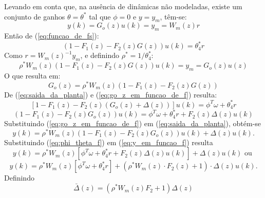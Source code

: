   Levando em conta que, na ausência de dinâmicas não modeladas, existe um conjunto de ganhos $\theta = \theta^*$ tal que $\phi = 0$ e $y = y_m$, têm-se:
  \begin{equation}
    y(k) = G_o(z) u(k) = y_m = W_m(z) r
  \end{equation}
  Então de (\ref{eq:funcao_de_fs}):
  \begin{equation}
    \left( 1 - F_1(z) - F_2(z) G(z) \right) u(k) = \theta_4^* r
  \end{equation}
  Como $r = W_m(z)^{-1} y_m$, e definindo $\rho^* = 1/\theta_4^*$:
  \begin{equation*}
    \rho^* W_m(z) \left( 1 - F_1(z) - F_2(z) G(z) \right) u(k) = y_m = G_o(z) u(z)
  \end{equation*}
  O que resulta em:
  \begin{equation}
    G_o(z) = \rho^* W_m(z) \left( 1 - F_1(z) - F_2(z) G(z) \right)
    \label{eq:go_z_em_funcao_de_f}
  \end{equation}
  De (\ref{eq:saida_da_planta}) e (\ref{eq:go_z_em_funcao_de_f}) resulta:
  \begin{equation*}
    \left[ 1 - F_1(z) - F_2(z) \left( G_o(z) + \Delta(z) \right) \right] u(k) = \phi^T \omega + \theta_4^* r
  \end{equation*}
  \begin{equation}
    \left( 1 - F_1(z) - F_2(z) G_o(z) \right) u(k) = \phi^T \omega + \theta_4^* r + F_2(z) \Delta(z) u(k)
    \label{eq:phi_theta_f}
  \end{equation}
  Substituindo (\ref{eq:go_z_em_funcao_de_f}) em (\ref{eq:saida_da_planta}), obtém-se
  \begin{equation}
    y(k) = \rho^* W_m(z) \left( 1 - F_1(z) - F_2(z) G_o(z) \right) u(k) + \Delta(z) u(k) \text{.}
    \label{eq:y_em_funcao_f}
  \end{equation}
  Substituindo (\ref{eq:phi_theta_f}) em (\ref{eq:y_em_funcao_f}) resulta
  \begin{equation*}
    y(k) = \rho^* W_m(z) \left[ \phi^T \omega + \theta_4^* r + F_2(z)
      \Delta(z) u(k) \right] + \Delta(z) u(k) \text{ ou }
  \end{equation*}
  \begin{equation*}
    y(k) = \rho^* W_m(z) \left[ \phi^T \omega + \theta_4^* r
      \right] + \left( \rho^* W_m(z) \cdot F_2(z) + 1
      \right) \cdot \Delta(z) u(k) \text{.}
  \end{equation*}
  Definindo
  \begin{equation*}
    \bar{\Delta}(z) = \left( \rho^* W_m(z) F_2 + 1 \right) \Delta(z)
  \end{equation*}
